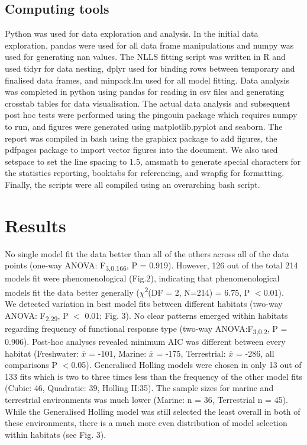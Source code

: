 \documentclass[11pt]{article}
\begin{document}
	\subsection*{Computing tools}
	
	Python was used for data exploration and analysis. In the initial data exploration, pandas were used for all data frame manipulations and numpy was used for generating nan values. The NLLS fitting script was written in R and used tidyr for data nesting, dplyr used for binding rows between temporary and finalised data frames, and minpack.lm used for all model fitting. Data analysis was completed in python using pandas for reading in csv files and generating crosstab tables for data visualisation. The actual data analysis and subsequent post hoc tests were performed using the pingouin package which requires numpy to run, and figures were generated using matplotlib.pyplot and seaborn. The report was compiled in bash using the graphicx package to add figures, the pdfpages package to import vector figures into the document. We also used setspace to set the line spacing to 1.5, amsmath to generate special characters for the statistics reporting, booktabs for referencing, and wrapfig for formatting. Finally, the scripts were all compiled using an overarching bash script. 
	
	\newpage
	
	\section*{Results}
	No single model fit the data better than all of the others across all of the data points (one-way ANOVA: F\textsubscript{3,0.166}, P = 0.919). However, 126 out of the total 214 models fit were phenomenological (Fig.2), indicating that phenomenological models fit the data better generally ($\chi$\textsuperscript{2}(DF = 2, N=214) = 6.75, P $<$0.01).\\
	
	We detected variation in best model fits between different habitats (two-way ANOVA: F\textsubscript{2,29}, P $<$ 0.01; Fig. 3). No clear patterns emerged within habitats regarding frequency of functional response type (two-way ANOVA:F\textsubscript{3,0.2}, P = 0.906). Post-hoc analyses revealed minimum AIC was different between every habitat (Freshwater: $\overline{x}$ = -101, Marine: $\overline{x}$ = -175, Terrestrial: $\overline{x}$ = -286, all comparisons P $<$0.05). Generalised Holling models were chosen in only 13 out of 133 fits which is two to three times less than the frequency of the other model fits (Cubic: 46, Quadratic: 39, Holling II:35). The sample sizes for marine and terrestrial environments was much lower (Marine: n = 36, Terrestrial n = 45). While the Generalised Holling model was still selected the least overall in both of these environments, there is a much more even distribution of model selection within habitats (see Fig. 3). \\
	
\end{document}
